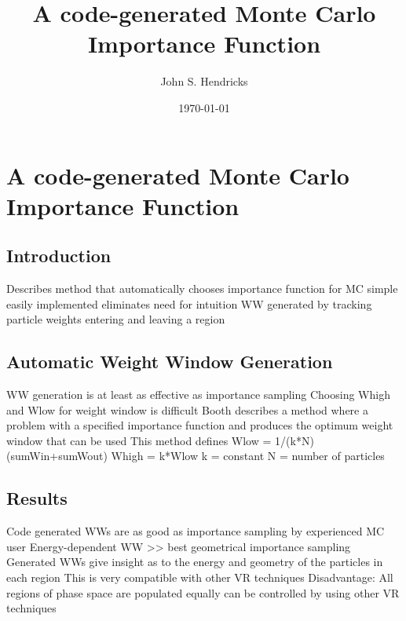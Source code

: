 \documentclass{report}
\begin{document}
\title{A code-generated Monte Carlo Importance Function}
\author{John S. Hendricks}
\date{\today}
\setcounter{secnumdepth}{0}
\section{A code-generated Monte Carlo Importance Function}
\subsection{Introduction}
\begin{outline}
 \1 Describes method that automatically chooses importance function for MC
   \2 simple
   \2 easily implemented
   \2 eliminates need for intuition 
 \1 WW generated by tracking particle weights entering and leaving a region
\end{outline}
\subsection{Automatic Weight Window Generation}
\begin{outline}
 \1 WW generation is at least as effective as importance sampling 
 \1 Choosing Whigh and Wlow for weight window is difficult
   \2 Booth describes a method where a problem with a specified importance function and produces the optimum weight window that can be used
   \2 This method defines 
     \3 Wlow = 1/(k*N) (sumWin+sumWout)
     \3 Whigh = k*Wlow 
     \3 k = constant
     \3 N = number of particles 
\end{outline}
\subsection{Results}
\begin{outline}
 \1 Code generated WWs are as good as importance sampling by experienced MC user
 \1 Energy-dependent WW >> best geometrical importance sampling
 \1 Generated WWs give insight as to the energy and geometry of the particles in each region
 \1 This is very compatible with other VR techniques
 \1 Disadvantage:
   \2 All regions of phase space are populated equally
   \2 can be controlled by using other VR techniques
\end{outline}
\end{document}
